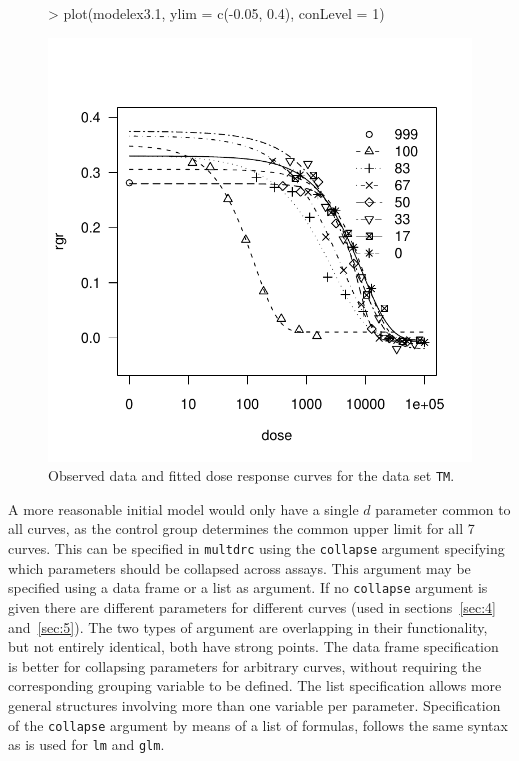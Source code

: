 \documentclass[a4paper]{article}
\begin{document}
\begin{figure}[!htbp]
\begin{center}
\begin{Schunk}
\begin{Sinput}
> plot(modelex3.1, ylim = c(-0.05, 0.4), conLevel = 1)
\end{Sinput}
\end{Schunk}
\includegraphics{drc-sec6-plot1}
\caption{Observed data and fitted dose response curves for the data set \texttt{TM}.} \label{sec6-plot1}
\end{center}
\end{figure}

A more reasonable initial model would only have a single $d$ parameter common to all curves, as the control group determines the common upper limit for
all 7 curves.
This can be specified in \verb+multdrc+ using the \verb+collapse+ argument specifying which parameters should be collapsed across assays. 
This argument may be
specified using a data frame or a list as argument. If no \verb+collapse+ argument is given there are different parameters for different curves
(used in sections~\ref{sec:4} and~\ref{sec:5}).
The two types of argument are overlapping in their functionality, but not entirely identical, both have strong points.
The data frame specification is better for collapsing parameters for arbitrary curves, without requiring the corresponding grouping variable to be defined.
The list specification allows more general structures involving more than one variable per parameter. Specification of the 
\verb+collapse+ argument by means of a list of formulas, follows the same syntax as is used for \verb+lm+ and \verb+glm+.
\end{document}
